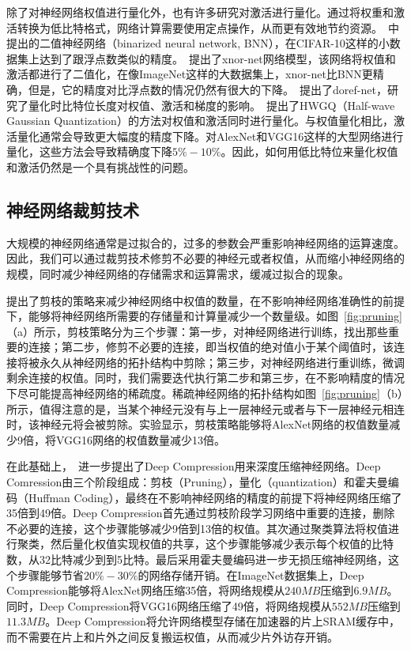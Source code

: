 除了对神经网络权值进行量化外，也有许多研究对激活进行量化。通过将权重和激活转换为低比特格式，网络计算需要使用定点操作，从而更有效地节约资源。~\citet{hubara2016binarized}中提出的二值神经网络（binarized neural network, BNN），在CIFAR-10这样的小数据集上达到了跟浮点数类似的精度。~\citet{rastegari2016xnor}提出了xnor-net网络模型，该网络将权值和激活都进行了二值化，在像ImageNet这样的大数据集上，xnor-net比BNN更精确，但是，它的精度对比浮点数的情况仍然有很大的下降。~\citet{zhou2016dorefa}提出了doref-net，研究了量化时比特位长度对权值、激活和梯度的影响。~\citet{cai2017deep}提出了HWGQ（Half-wave Gaussian Quantization）的方法对权值和激活同时进行量化。与权值量化相比，激活量化通常会导致更大幅度的精度下降。对AlexNet和VGG16这样的大型网络进行量化，这些方法会导致精确度下降$5\% - 10\%$。因此，如何用低比特位来量化权值和激活仍然是一个具有挑战性的问题。


\subsection{神经网络裁剪技术}
大规模的神经网络通常是过拟合的，过多的参数会严重影响神经网络的运算速度。因此，我们可以通过裁剪技术修剪不必要的神经元或者权值，从而缩小神经网络的规模，同时减少神经网络的存储需求和运算需求，缓减过拟合的现象。

\citet{han2015learning}提出了剪枝的策略来减少神经网络中权值的数量，在不影响神经网络准确性的前提下，能够将神经网络所需要的存储量和计算量减少一个数量级。如图~\ref{fig:pruning}（a）所示，剪枝策略分为三个步骤：第一步，对神经网络进行训练，找出那些重要的连接；第二步，修剪不必要的连接，即当权值的绝对值小于某个阈值时，该连接将被永久从神经网络的拓扑结构中剪除；第三步，对神经网络进行重训练，微调剩余连接的权值。同时，我们需要迭代执行第二步和第三步，在不影响精度的情况下尽可能提高神经网络的稀疏度。稀疏神经网络的拓扑结构如图~\ref{fig:pruning}（b）所示，值得注意的是，当某个神经元没有与上一层神经元或者与下一层神经元相连时，该神经元将会被剪除。实验显示，剪枝策略能够将AlexNet网络的权值数量减少9倍，将VGG16网络的权值数量减少13倍。

在此基础上，~\citet{han2015deep}进一步提出了Deep Compression用来深度压缩神经网络。Deep Comression由三个阶段组成：剪枝（Pruning），量化（quantization）和霍夫曼编码（Huffman Coding），最终在不影响神经网络的精度的前提下将神经网络压缩了35倍到49倍。Deep Compression首先通过剪枝阶段学习网络中重要的连接，删除不必要的连接，这个步骤能够减少9倍到13倍的权值。其次通过聚类算法将权值进行聚类，然后量化权值实现权值的共享，这个步骤能够减少表示每个权值的比特数，从32比特减少到到5比特。最后采用霍夫曼编码进一步无损压缩神经网络，这个步骤能够节省$20\%-30\%$的网络存储开销。在ImageNet数据集上，Deep Compression能够将AlexNet网络压缩35倍，将网络规模从$240MB$压缩到$6.9MB$。同时，Deep Compression将VGG16网络压缩了49倍，将网络规模从$552MB$压缩到$11.3MB$。Deep Compression将允许网络模型存储在加速器的片上SRAM缓存中，而不需要在片上和片外之间反复搬运权值，从而减少片外访存开销。

